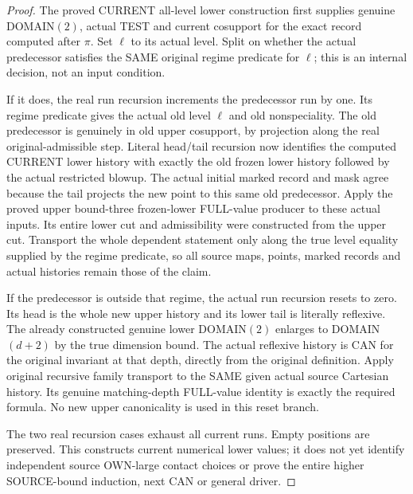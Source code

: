 \begin{proof}
The proved CURRENT all-level lower construction first supplies genuine
DOMAIN$(2)$, actual TEST and current cosupport for the exact record
computed after $\pi$. Set $\ell$ to its actual level. Split on whether
the actual predecessor satisfies the SAME original regime predicate
for $\ell$; this is an internal decision, not an input condition.

If it does, the real run recursion increments the predecessor run by
one. Its regime predicate gives the actual old level $\ell$ and old
nonspeciality. The old predecessor is genuinely in old upper cosupport,
by projection along the real original-admissible step. Literal head/tail
recursion now identifies the computed CURRENT lower history with exactly
the old frozen lower history followed by the actual restricted blowup.
The actual initial marked record and mask agree because the tail projects
the new point to this same old predecessor. Apply the proved upper
bound-three frozen-lower FULL-value producer to these actual inputs.
Its entire lower cut and admissibility were constructed from the upper
cut. Transport the whole dependent statement only along the true level
equality supplied by the regime predicate, so all source maps, points,
marked records and actual histories remain those of the claim.

If the predecessor is outside that regime, the actual run recursion
resets to zero. Its head is the whole new upper history and its lower
tail is literally reflexive. The already constructed genuine lower
DOMAIN$(2)$ enlarges to DOMAIN$(d+2)$ by the true dimension bound.
The actual reflexive history is CAN for the original invariant at that
depth, directly from the original definition. Apply original recursive
family transport to the SAME given actual source Cartesian history.
Its genuine matching-depth FULL-value identity is exactly the required
formula. No new upper canonicality is used in this reset branch.

The two real recursion cases exhaust all current runs. Empty positions
are preserved. This constructs current numerical lower values; it does
not yet identify independent source OWN-large contact choices or prove
the entire higher SOURCE-bound induction, next CAN or general driver.
\end{proof}
